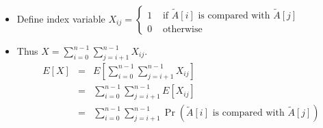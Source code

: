 \documentclass[mathserif]{beamer}
\begin{document}
{\begin{figure}

\end{figure}




\begin{itemize}

      \item Define index variable $X_{ij} = \begin{cases} 
      1 & \text{ if } \tilde{A}[i] \text{ is compared with } \tilde{A}[j] \nonumber \\
      0 & \text{ otherwise } \nonumber
      \end{cases} $
      \item Thus  $X = \sum\nolimits_{i=0}^{n-1}\sum\nolimits_{j=i+1}^{n-1} X_{ij}$. 
      \begin{eqnarray}
      E[ X ] & = &  E [\sum\nolimits_{i=0}^{n-1}\sum\nolimits_{j=i+1}^{n-1} X_{ij} ] \nonumber \\
              & = &   \sum\nolimits_{i=0}^{n-1}\sum\nolimits_{j=i+1}^{n-1} E[ X_{ij} ] \nonumber \\
              & = &   \sum\nolimits_{i=0}^{n-1}\sum\nolimits_{j=i+1}^{n-1} \Pr( \tilde{A}[i]  \text{ is compared with } \tilde{A}[j] )  \nonumber 
      \end{eqnarray} 

\end{itemize} 
}
\end{document}
